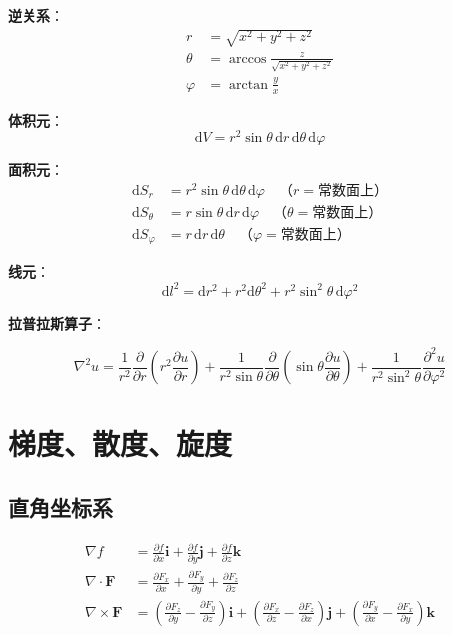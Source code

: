 \textbf{逆关系}：
\begin{align}
    r &= \sqrt{x^2 + y^2 + z^2} \\
    \theta &= \arccos\frac{z}{\sqrt{x^2+y^2+z^2}} \\
    \varphi &= \arctan\frac{y}{x}
\end{align}

\textbf{体积元}：
\begin{equation}
    \mathrm{d}V = r^2\sin\theta\,\mathrm{d}r\,\mathrm{d}\theta\,\mathrm{d}\varphi
\end{equation}

\textbf{面积元}：
\begin{align}
    \mathrm{d}S_r &= r^2\sin\theta\,\mathrm{d}\theta\,\mathrm{d}\varphi \quad \text{（$r=$常数面上）} \\
    \mathrm{d}S_\theta &= r\sin\theta\,\mathrm{d}r\,\mathrm{d}\varphi \quad \text{（$\theta=$常数面上）} \\
    \mathrm{d}S_\varphi &= r\,\mathrm{d}r\,\mathrm{d}\theta \quad \text{（$\varphi=$常数面上）}
\end{align}

\textbf{线元}：
\begin{equation}
    \mathrm{d}l^2 = \mathrm{d}r^2 + r^2\mathrm{d}\theta^2 + r^2\sin^2\theta\,\mathrm{d}\varphi^2
\end{equation}

\textbf{拉普拉斯算子}：
\begin{zhongyao}[球坐标系拉普拉斯算子]
\[
    \nabla^2 u = \frac{1}{r^2}\frac{\partial}{\partial r}\left(r^2\frac{\partial u}{\partial r}\right) + \frac{1}{r^2\sin\theta}\frac{\partial}{\partial\theta}\left(\sin\theta\frac{\partial u}{\partial\theta}\right) + \frac{1}{r^2\sin^2\theta}\frac{\partial^2 u}{\partial\varphi^2}
\]
\end{zhongyao}

\section{梯度、散度、旋度}

\subsection{直角坐标系}
\begin{align}
    \nabla f &= \frac{\partial f}{\partial x}\boldsymbol{i} + \frac{\partial f}{\partial y}\boldsymbol{j} + \frac{\partial f}{\partial z}\boldsymbol{k} \\
    \nabla \cdot \boldsymbol{F} &= \frac{\partial F_x}{\partial x} + \frac{\partial F_y}{\partial y} + \frac{\partial F_z}{\partial z} \\
    \nabla \times \boldsymbol{F} &= \left(\frac{\partial F_z}{\partial y} - \frac{\partial F_y}{\partial z}\right)\boldsymbol{i} + \left(\frac{\partial F_x}{\partial z} - \frac{\partial F_z}{\partial x}\right)\boldsymbol{j} + \left(\frac{\partial F_y}{\partial x} - \frac{\partial F_x}{\partial y}\right)\boldsymbol{k}
\end{align}

